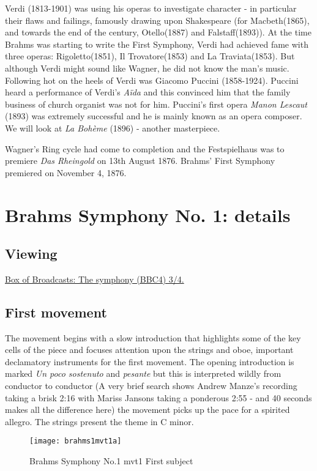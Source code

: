 Verdi (1813-1901) was using his operas to investigate character - in particular their flaws and failings, famously drawing upon Shakespeare (for Macbeth(1865), and towards the end of the century, Otello(1887) and Falstaff(1893)). 
At the time Brahms was starting to write the First Symphony, Verdi had achieved fame with three operas: Rigoletto(1851), Il Trovatore(1853) and La Traviata(1853). But although Verdi might sound like Wagner, he did not know the man's music. Following hot on the heels of Verdi was Giacomo Puccini (1858-1924). Puccini heard a performance of Verdi's \textit{A\"ida} and this convinced him that the family business of church organist was not for him. Puccini's first opera \textit{Manon Lescaut} (1893) was extremely successful and he is mainly known as an opera composer. We will look at \textit{La Boh\`eme} (1896) - another masterpiece. 

Wagner's Ring cycle had come to completion and the Festspielhaus was to premiere \textit{Das Rheingold} on 13th August 1876. Brahms' First Symphony premiered on November 4, 1876. 

\section{Brahms Symphony No. 1: details} 

\subsection{Viewing}
\href{http://bobnational.net/record/92680/media_id/99760}{Box of Broadcasts: The symphony (BBC4) 3/4.} 

\subsection{First movement}

The movement begins with a slow introduction that highlights some of the key cells of the piece and focuses attention upon the strings and oboe, important declamatory instruments for the first movement. The opening introduction is marked \textit{Un poco sostenuto} and \textit{pesante} but this is interpreted wildly from conductor to conductor (A very brief search shows Andrew Manze's recording taking a brisk 2:16 with Mariss Jansons taking a ponderous 2:55 - and 40 seconds makes all the difference here) the movement picks up the pace for a spirited allegro. The strings present the theme in C minor.

\begin{figure}[H]
\centering
\texttt{[image: brahms1mvt1a]}\caption{Brahms Symphony No.1 mvt1 First subject}
\label{fig:b1m1first}
\end{figure}

